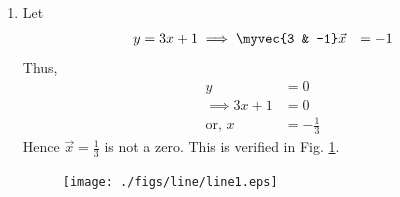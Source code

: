 \renewcommand{\theequation}{\theenumi}
\begin{enumerate}[label=\arabic*.,ref=\thesubsubsection.\theenumi]
%
\item Let 
%
\begin{align}
y &= 3x + 1
\implies \myvec{3 & -1}\vec{x} &= -1
\end{align}
%
Thus, 
%
\begin{align}
y &= 0 
\\
\implies  3x + 1 &=0
\\
\text{or, } x &= -\frac{1}{3}
\end{align}
%
Hence $\vec{x}=\frac{1}{3}$ is not a zero. This is verified in Fig. \ref{fig:line1}.
%
\begin{figure}[!ht]
\texttt{[image: ./figs/line/line1.eps]}
\caption{}
\label{fig:line1}
\end{figure}


\end{enumerate}
